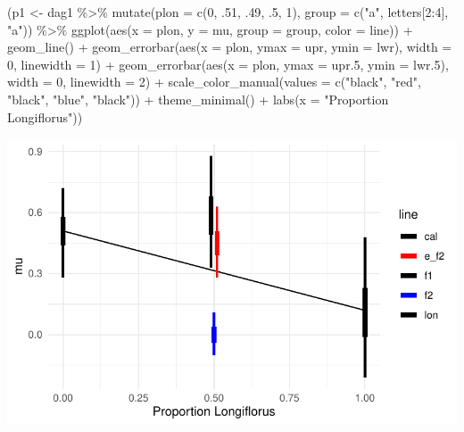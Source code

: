 \documentclass[
  letterpaper,
  DIV=11,
  numbers=noendperiod]{scrartcl}
\newenvironment{Shaded}{\begin{snugshade}}{\end{snugshade}}
\newcommand{\AttributeTok}[1]{\textcolor[rgb]{0.40,0.45,0.13}{#1}}
\newcommand{\DecValTok}[1]{\textcolor[rgb]{0.68,0.00,0.00}{#1}}
\newcommand{\FloatTok}[1]{\textcolor[rgb]{0.68,0.00,0.00}{#1}}
\newcommand{\FunctionTok}[1]{\textcolor[rgb]{0.28,0.35,0.67}{#1}}
\newcommand{\NormalTok}[1]{\textcolor[rgb]{0.00,0.23,0.31}{#1}}
\newcommand{\OtherTok}[1]{\textcolor[rgb]{0.00,0.23,0.31}{#1}}
\newcommand{\SpecialCharTok}[1]{\textcolor[rgb]{0.37,0.37,0.37}{#1}}
\newcommand{\StringTok}[1]{\textcolor[rgb]{0.13,0.47,0.30}{#1}}
\begin{document}
\begin{Shaded}
\begin{Highlighting}[]
\NormalTok{(p1 }\OtherTok{\textless{}{-}}\NormalTok{ dag1 }\SpecialCharTok{\%\textgreater{}\%} 
  \FunctionTok{mutate}\NormalTok{(}\AttributeTok{plon =} \FunctionTok{c}\NormalTok{(}\DecValTok{0}\NormalTok{, .}\DecValTok{51}\NormalTok{, .}\DecValTok{49}\NormalTok{, .}\DecValTok{5}\NormalTok{, }\DecValTok{1}\NormalTok{),}
         \AttributeTok{group =} \FunctionTok{c}\NormalTok{(}\StringTok{"a"}\NormalTok{, letters[}\DecValTok{2}\SpecialCharTok{:}\DecValTok{4}\NormalTok{], }\StringTok{"a"}\NormalTok{)) }\SpecialCharTok{\%\textgreater{}\%} 
  \FunctionTok{ggplot}\NormalTok{(}\FunctionTok{aes}\NormalTok{(}\AttributeTok{x =}\NormalTok{ plon, }\AttributeTok{y =}\NormalTok{ mu, }\AttributeTok{group =}\NormalTok{ group, }\AttributeTok{color =}\NormalTok{ line)) }\SpecialCharTok{+}
  \FunctionTok{geom\_line}\NormalTok{() }\SpecialCharTok{+}
  \FunctionTok{geom\_errorbar}\NormalTok{(}\FunctionTok{aes}\NormalTok{(}\AttributeTok{x =}\NormalTok{ plon, }\AttributeTok{ymax =}\NormalTok{ upr, }\AttributeTok{ymin =}\NormalTok{ lwr), }\AttributeTok{width =} \DecValTok{0}\NormalTok{, }
                \AttributeTok{linewidth =} \DecValTok{1}\NormalTok{) }\SpecialCharTok{+}
  \FunctionTok{geom\_errorbar}\NormalTok{(}\FunctionTok{aes}\NormalTok{(}\AttributeTok{x =}\NormalTok{ plon, }\AttributeTok{ymax =}\NormalTok{ upr}\FloatTok{.5}\NormalTok{, }\AttributeTok{ymin =}\NormalTok{ lwr}\FloatTok{.5}\NormalTok{), }\AttributeTok{width =} \DecValTok{0}\NormalTok{,}
                \AttributeTok{linewidth =} \DecValTok{2}\NormalTok{) }\SpecialCharTok{+}
  \FunctionTok{scale\_color\_manual}\NormalTok{(}\AttributeTok{values =} \FunctionTok{c}\NormalTok{(}\StringTok{"black"}\NormalTok{, }\StringTok{"red"}\NormalTok{, }\StringTok{"black"}\NormalTok{, }\StringTok{"blue"}\NormalTok{, }\StringTok{"black"}\NormalTok{)) }\SpecialCharTok{+}
  \FunctionTok{theme\_minimal}\NormalTok{() }\SpecialCharTok{+}
  \FunctionTok{labs}\NormalTok{(}\AttributeTok{x =} \StringTok{"Proportion Longiflorus"}\NormalTok{))}
\end{Highlighting}
\end{Shaded}

\includegraphics{analysis_files/figure-pdf/unnamed-chunk-8-1.pdf}
\end{document}
